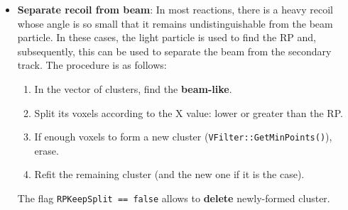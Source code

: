 \documentclass[11pt, a4paper, english]{article}
\begin{document}
\begin{itemize}
	\item \textbf{Separate recoil from beam}: In most reactions, there is a heavy recoil whose angle is so small that it remains undistinguishable from the beam particle. In these cases, the light particle is used to find the RP and, subsequently, this can be used to separate the beam from the secondary track. The procedure is as follows:
	\begin{enumerate}
		\item In the vector of clusters, find the \textbf{beam-like}.
		\item Split its voxels according to the X value: lower or greater than the RP.
		\item If enough voxels to form a new cluster (\lstinline|VFilter::GetMinPoints()|), erase.
		\item Refit the remaining cluster (and the new one if it is the case).
	\end{enumerate}
	The flag \lstinline|RPKeepSplit == false| allows to \textbf{delete} newly-formed cluster.
\end{itemize}



\printbibliography
\end{document}
